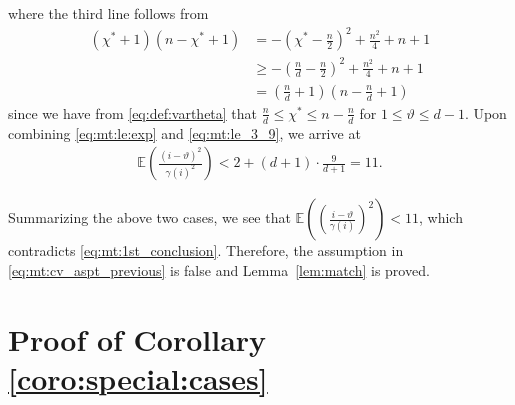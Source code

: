 \documentclass[onecolumn,letterpaper]{IEEEtran}
\newcommand{\plsize}{{\chi}}
\newcommand{\apn}{{\gamma}}
\newcommand{\cE}{{\mathbb{E}}}
\newcommand{\mnp}{{\vartheta}}
\newcommand{\idex}{{i}}
\begin{document}
where the third line follows from 
\begin{align*}
    (\plsize^{*}+1)(n-\plsize^{*}+1)&=-\left(\plsize^{*}-\frac{n}{2}\right)^2+\frac{n^2}{4}+n+1\\ &\geq-\left(\frac{n}{d}-\frac{n}{2}\right)^2+\frac{n^2}{4}+n+1 \\
    &=\left(\frac{n}{d}+1\right)\left(n-\frac{n}{d}+1\right)
\end{align*}
since we have from \eqref{eq:def:vartheta} that $\frac{n}{d}\leq \plsize^{*}\leq n-\frac{n}{d}$ for $ 1\leq \mnp \leq d-1$.
Upon combining \eqref{eq:mt:le:exp} and \eqref{eq:mt:le_3_9}, we arrive at
\begin{align*}
    \cE \left(\frac{(\idex-\mnp)^2}{ \apn(\idex)^2}\right)
    < 2 + \left( d+1 \right) \cdot \frac{9}{d+1} = 11.
\end{align*}

Summarizing the above two cases, we see that $\cE \left( \left(\frac{\idex-\mnp}{\apn(\idex)}\right)^2 \right) < 11$,
which contradicts \eqref{eq:mt:1st_conclusion}. Therefore, the assumption in \eqref{eq:mt:cv_aspt_previous} is false and Lemma~\ref{lem:match} is proved.


\section{Proof of Corollary \ref{coro:special:cases}}
\label{app:coro:cases}
\end{document}
